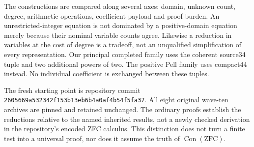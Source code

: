 \documentclass[11pt]{article}
\newcommand{\Con}{\operatorname{Con}}
\begin{document}
The constructions are compared along several axes: domain, unknown count,
degree, arithmetic operations, coefficient payload and proof burden.
An unrestricted-integer equation is not dominated by a positive-domain
equation merely because their nominal variable counts agree.
Likewise a reduction in variables at the cost of degree is a tradeoff,
not an unqualified simplification of every representation.
Our principal completed family uses the coherent source34 tuple and two
additional powers of two. The positive Pell family uses compact44 instead.
No individual coefficient is exchanged between these tuples.

The fresh starting point is repository commit
\texttt{2605669a532342f153b13eb6b4a0af4b54f5fa37}.
All eight original wave-ten archives are pinned and retained unchanged.
The ordinary proofs establish the reductions relative to the named inherited
results, not a newly checked derivation in the repository's encoded ZFC
calculus. This distinction does not turn a finite test into a universal
proof, nor does it assume the truth of $\Con(\mathrm{ZFC})$.


\end{document}
